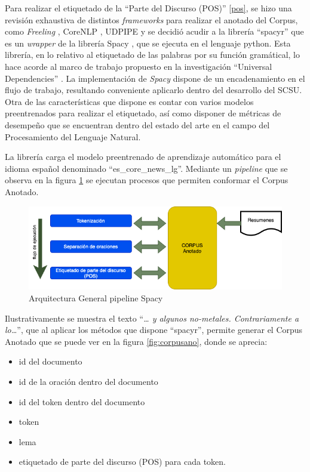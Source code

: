 \documentclass[
  12pt,
  openany]{book}
\begin{document}
Para realizar el etiquetado de la ``Parte del Discurso (POS)'' \ref{pos}, se hizo una revisión exhaustiva de distintos \emph{frameworks} para realizar el anotado del Corpus, como \emph{Freeling} \citep{padro12}, CoreNLP \citep{manning-etal-2014-stanford}, UDPIPE \citep{udpipe-2} y se decidió acudir a la librería ``spacyr'' \citep{spacyr} que es un \emph{wrapper} de la librería Spacy \citep{spacy2020}, que se ejecuta en el lenguaje python. Esta librería, en lo relativo al etiquetado de las palabras por su función gramátical, lo hace acorde al marco de trabajo propuesto en la investigación ``Universal Dependencies'' \citep{demarneffe2021}. La implementación de \emph{Spacy} dispone de un encadenamiento en el flujo de trabajo, resultando conveniente aplicarlo dentro del desarrollo del SCSU. Otra de las características que dispone es contar con varios modelos preentrenados para realizar el etiquetado, así como disponer de métricas de desempeño que se encuentran dentro del estado del arte en el campo del Procesamiento del Lenguaje Natural.

La librería carga el modelo preentrenado de aprendizaje automático para el idioma español denominado ``es\_core\_news\_lg''. Mediante un \emph{pipeline} que se observa en la figura \ref{fig:spacypi} se ejecutan procesos que permiten conformar el Corpus Anotado.

\begin{figure}

{\centering \includegraphics[width=0.8\linewidth]{images/05-desarrollo/2_ciclo/nlp/spacy_pipeline1} 

}

\caption{Arquitectura General pipeline Spacy}\label{fig:spacypi}
\end{figure}

Ilustrativamente se muestra el texto ``\emph{\ldots{} y algunos no-metales. Contrariamente a lo\ldots{}}'', que al aplicar los métodos que dispone ``spacyr'', permite generar el Corpus Anotado que se puede ver en la figura \ref{fig:corpusano}, donde se aprecia:

\begin{itemize}
\item
  id del documento
\item
  id de la oración dentro del documento
\item
  id del token dentro del documento
\item
  token
\item
  lema
\item
  etiquetado de parte del discurso (POS) para cada token.
\end{itemize}
\end{document}
